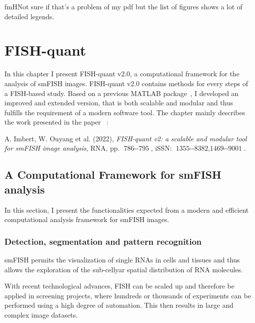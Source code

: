 
\graphicspath{{./figures/chapter1/}}
fm{HNot sure if that's a problem of my pdf but the list of figures shows a lot of detailed legends.}
\chapter{FISH-quant}
\label{ch:chapter1}

\minitoc
\newpage

In this chapter I present FISH-quant v2.0, a computational framework for the analysis of \ac{smFISH} images.
FISH-quant v2.0 contains methods for every steps of a \ac{FISH}-based study.
Based on a previous MATLAB package~\cite{mueller_fish-quant_2013}, I developed an improved and extended version, that is both scalable and modular and thus fulfills the requirement of a modern software tool.
The chapter mainly describes the work presented in the paper~\cite{Imbert_fq_2022} :

\begin{center}
	\color{green}
	A. Imbert, W. Ouyang et al. (2022), \textit{FISH-quant v2: a scalable and modular tool for smFISH image analysis}, RNA, pp. $\operatorname{786--795}$, iSSN: $\operatorname{1355--8382, 1469--9001}$.
\end{center}

\section{A Computational Framework for smFISH analysis}
\label{sec:framework}

In this section, I present the functionalities expected from a modern and efficient computational analysis framework for \ac{smFISH} images. 

\subsection{Detection, segmentation and pattern recognition}
\label{subsec:pipeline_stages}

\ac{smFISH} permits the visualization of single RNAs in cells and tissues and thus allows the exploration of the sub-cellyar spatial distribution of RNA molecules.

With recent technological advances, \ac{FISH} can be scaled up and therefore be applied in screening projects, where hundreds or thousands of experiments can be performed using a high degree of automation.
This then results in large and complex image datasets.

